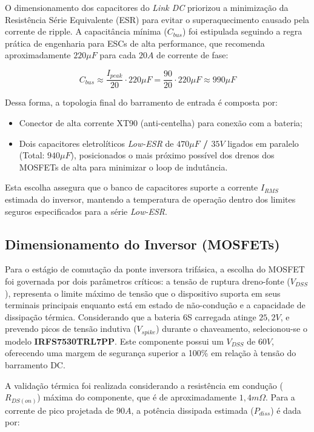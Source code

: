 O dimensionamento dos capacitores do \textit{Link DC} priorizou a minimização da Resistência Série Equivalente (ESR) para evitar o superaquecimento causado pela corrente de ripple. A capacitância mínima ($C_{bus}$) foi estipulada seguindo a regra prática de engenharia para ESCs de alta performance, que recomenda aproximadamente $220\mu F$ para cada $20A$ de corrente de fase:

\begin{equation}
    C_{bus} \approx \frac{I_{peak}}{20} \cdot 220\mu F = \frac{90}{20} \cdot 220\mu F \approx 990 \mu F
\end{equation}

Dessa forma, a topologia final do barramento de entrada é composta por:
\begin{itemize}
    \item Conector de alta corrente XT90 (anti-centelha) para conexão com a bateria;
    \item Dois capacitores eletrolíticos \textit{Low-ESR} de \textbf{$470\mu F$ / $35V$} ligados em paralelo (Total: $940\mu F$), posicionados o mais próximo possível dos drenos dos MOSFETs de alta para minimizar o loop de indutância.
\end{itemize}

Esta escolha assegura que o banco de capacitores suporte a corrente $I_{RMS}$ estimada do inversor, mantendo a temperatura de operação dentro dos limites seguros especificados para a série \textit{Low-ESR}.

\subsection{Dimensionamento do Inversor (MOSFETs)}
Para o estágio de comutação da ponte inversora trifásica, a escolha do MOSFET foi governada por dois parâmetros críticos: a tensão de ruptura dreno-fonte ($V_{DSS}$), representa o limite máximo de tensão que o dispositivo suporta em seus terminais principais enquanto está em estado de não-condução e a capacidade de dissipação térmica. Considerando que a bateria 6S carregada atinge $25,2V$, e prevendo picos de tensão indutiva ($V_{spike}$) durante o chaveamento, selecionou-se o modelo \textbf{IRFS7530TRL7PP}. Este componente possui um $V_{DSS}$ de $60V$, oferecendo uma margem de segurança superior a 100\% em relação à tensão do barramento DC.

A validação térmica foi realizada considerando a resistência em condução ($R_{DS(on)}$) máxima do componente, que é de aproximadamente $1,4 m\Omega$. Para a corrente de pico projetada de $90A$, a potência dissipada estimada ($P_{diss}$) é dada por:

